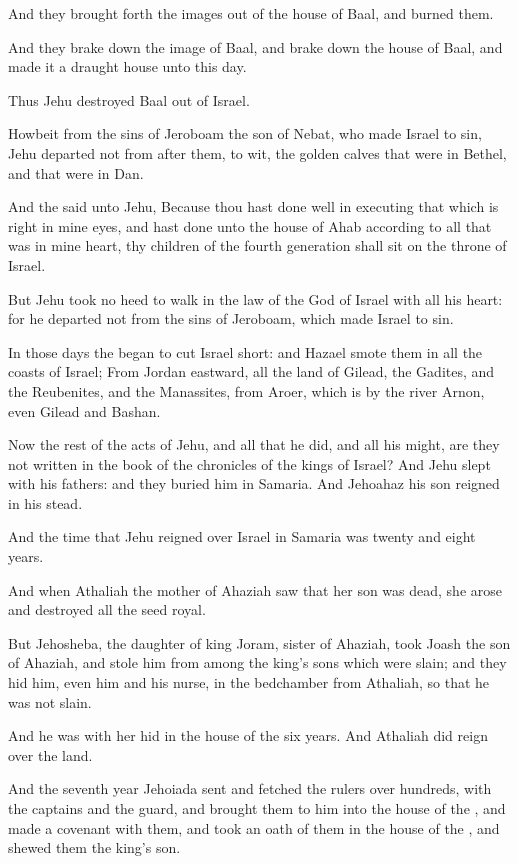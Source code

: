 \Verse And they brought forth the images out of the house of Baal, and burned them.

\Verse And they brake down the image of Baal, and brake down the house of Baal, and made it a draught house unto this day.

\Verse Thus Jehu destroyed Baal out of Israel.

\Verse Howbeit from the sins of Jeroboam the son of Nebat, who made Israel to sin, Jehu departed not from after them, to wit, the golden calves that were in Bethel, and that were in Dan.

\Verse And the \LORD said unto Jehu, Because thou hast done well in executing that which is right in mine eyes, and hast done unto the house of Ahab according to all that was in mine heart, thy children of the fourth generation shall sit on the throne of Israel.

\Verse But Jehu took no heed to walk in the law of the \LORD God of Israel with all his heart: for he departed not from the sins of Jeroboam, which made Israel to sin.

\Verse In those days the \LORD began to cut Israel short: and Hazael smote them in all the coasts of Israel; \Verse From Jordan eastward, all the land of Gilead, the Gadites, and the Reubenites, and the Manassites, from Aroer, which is by the river Arnon, even Gilead and Bashan.

\Verse Now the rest of the acts of Jehu, and all that he did, and all his might, are they not written in the book of the chronicles of the kings of Israel?  \Verse And Jehu slept with his fathers: and they buried him in Samaria. And Jehoahaz his son reigned in his stead.

\Verse And the time that Jehu reigned over Israel in Samaria was twenty and eight years.


\Chapter
\Verse And when Athaliah the mother of Ahaziah saw that her son was dead, she arose and destroyed all the seed royal.

\Verse But Jehosheba, the daughter of king Joram, sister of Ahaziah, took Joash the son of Ahaziah, and stole him from among the king's sons which were slain; and they hid him, even him and his nurse, in the bedchamber from Athaliah, so that he was not slain.

\Verse And he was with her hid in the house of the \LORD six years. And Athaliah did reign over the land.

\Verse And the seventh year Jehoiada sent and fetched the rulers over hundreds, with the captains and the guard, and brought them to him into the house of the \LORD, and made a covenant with them, and took an oath of them in the house of the \LORD, and shewed them the king's son.

